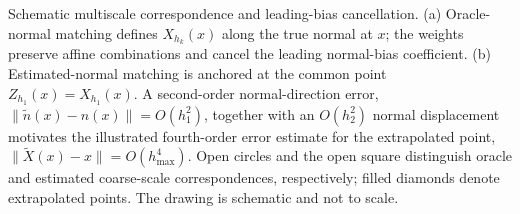 \caption{Schematic multiscale correspondence and leading-bias cancellation.
(a) Oracle-normal matching defines $X_{h_k}(x)$ along the true normal at $x$;
the weights preserve affine combinations and cancel the leading normal-bias
coefficient. (b) Estimated-normal matching is anchored at the common point
$Z_{h_1}(x)=X_{h_1}(x)$. A second-order normal-direction error,
$\|\widetilde n(x)-n(x)\|=O(h_1^2)$, together with an $O(h_2^2)$ normal
displacement motivates the illustrated fourth-order error estimate for the
extrapolated point,
$\|\widetilde X(x)-x\|=O(h_{\max}^4)$.
Open circles and the open square distinguish oracle and estimated coarse-scale
correspondences, respectively; filled diamonds denote extrapolated points.
The drawing is schematic and not to scale.}
\label{fig:oracle-estimated-normal-correspondence}
